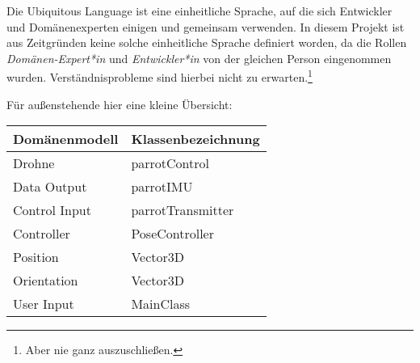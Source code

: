 
Die Ubiquitous Language ist eine einheitliche Sprache, auf die sich Entwickler und Domänenexperten einigen und gemeinsam verwenden. In diesem Projekt ist aus Zeitgründen keine solche einheitliche Sprache definiert worden, da die Rollen \textit{Domänen-Expert*in} und \textit{Entwickler*in} von der gleichen Person eingenommen wurden. Verständnisprobleme sind hierbei nicht zu erwarten.\footnote{Aber nie ganz auszuschließen.}


Für außenstehende hier eine kleine Übersicht: 
\begin{table}[!ht]
\begin{tabular}{ll}
Domänenmodell & Klassenbezeichnung \\ \hline
Drohne        & parrotControl      \\
Data Output   & parrotIMU          \\
Control Input & parrotTransmitter  \\
Controller    & PoseController     \\
Position      & Vector3D           \\
Orientation   & Vector3D           \\
User Input    & MainClass         
\end{tabular}
\end{table}






